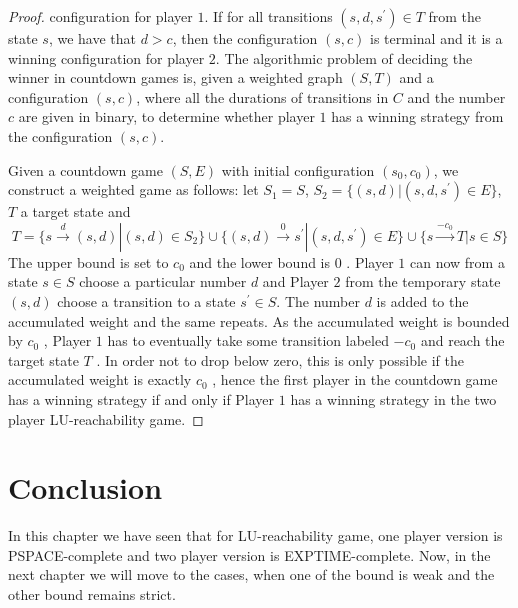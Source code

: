\begin{proof}
configuration for player $1$. If for all transitions $(s, d, s^{\prime}) \in T$ from the state $s$, we have
that $d > c$, then the configuration $(s, c)$ is terminal and it is a winning configuration for player $2$. The algorithmic problem of deciding the winner in countdown games is, given a weighted graph $(S, T)$ and a configuration $(s, c)$, where all the durations of transitions in $C$ and the number $c$ are given in binary, to determine whether player $1$ has a winning
strategy from the configuration $(s, c)$.

Given a countdown game $(S, E)$ with initial configuration $(s_0 , c_0)$, we construct a weighted game as follows: let $S_1 = S$, $S_2 = \{(s, d) | (s, d, s^{\prime}) \in E\}$, $T$ a target state and  
$$
T= \{s\xrightarrow{d}(s,d)|(s,d)\in S_2\}\cup \{(s,d)\xrightarrow{0} s^{\prime}| (s,d,s^{\prime}) \in E\}\cup \{s \xrightarrow{-c_0}T|s \in S\}
$$
The upper bound is set to $c_0$ and the lower bound is $0$ . Player $1$ can now from a state $s \in S$ choose a particular number $d$ and Player $2$ from the temporary state $(s, d)$ choose a transition to a state $s^{\prime} \in S$. The number $d$ is added to the accumulated weight and the same repeats. As the accumulated weight is bounded by $c_0$ , Player $1$ has to eventually take some transition labeled $−c_0$ and reach the target state $T$ . In order not to drop below zero, this is only possible if the accumulated weight is exactly $c_0$ , hence the first player in the countdown game has a winning strategy if and only if Player $1$ has a winning strategy in the two player LU-reachability game.
\end{proof}

\section{Conclusion}
In this chapter we have seen that for LU-reachability game, one player version is PSPACE-complete and two player version is EXPTIME-complete. Now, in the next chapter we will move to the cases, when one of the bound is weak and the other bound remains strict.
